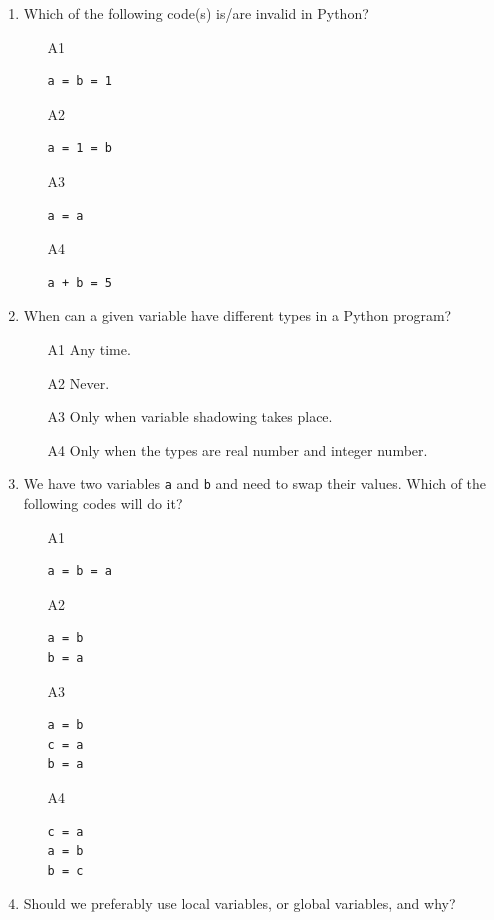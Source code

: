 \begin{enumerate}
\item Which of the following code(s) is/are invalid in Python?
\begin{enumerate}
\item[A1] 
\begin{verbatim}
a = b = 1
\end{verbatim}
\item[A2] 
\begin{verbatim}
a = 1 = b
\end{verbatim}
\item[A3] 
\begin{verbatim}
a = a
\end{verbatim}
\item[A4] 
\begin{verbatim}
a + b = 5
\end{verbatim}
\end{enumerate}
\item When can a given variable have different types in a Python program?
\begin{enumerate}
\item[A1] Any time.
\item[A2] Never.
\item[A3] Only when variable shadowing takes place.
\item[A4] Only when the types are real number and integer number.
\end{enumerate}
\item We have two variables {\tt a} and {\tt b} and need to swap their values. Which of the 
following codes will do it?
\begin{enumerate}
\item[A1] 
\begin{verbatim}
a = b = a
\end{verbatim}
\item[A2] 
\begin{verbatim}
a = b
b = a
\end{verbatim}
\item[A3] 
\begin{verbatim}
a = b
c = a
b = a
\end{verbatim}
\item[A4] 
\begin{verbatim}
c = a
a = b
b = c
\end{verbatim}
\end{enumerate}
\item Should we preferably use local variables, or global variables, and why?

\end{enumerate}
